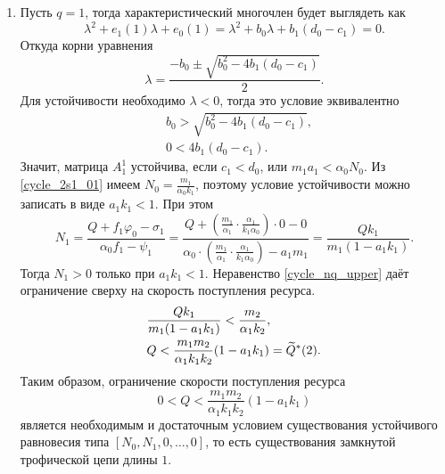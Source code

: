 \begin{enumerate}
\item Пусть \(q = 1\), тогда характеристический многочлен будет выглядеть как
\begin{equation*}
    \lambda^2 + e_1 (1) \lambda + e_0(1) = \lambda^2 + b_0 \lambda + b_1(d_0 - c_1) = 0.
\end{equation*}
Откуда корни уравнения
\begin{equation*}
    \lambda = \frac{-b_0 \pm \sqrt{b_0^2 - 4b_1 (d_0 - c_1)}}{2}.
\end{equation*}
Для устойчивости необходимо \(\lambda < 0\), тогда это условие эквивалентно
\begin{equation*}
    \begin{split}
        & b_0 > \sqrt{b_0^2 - 4b_1 (d_0 - c_1)}, \\
        & 0 < 4b_1 (d_0 - c_1).
    \end{split}
\end{equation*}
Значит, матрица \(A^1_1\) устойчива, если \(c_1 < d_0\), или \(m_1 a_1 < \alpha_0 N_0\). Из \eqref{cycle_2s1_01} имеем \(N_0 = \frac{m_1}{\alpha_0 k_1}\), поэтому условие устойчивости можно записать в виде \(a_1 k_1 < 1\). При этом
\begin{equation*}
    N_1 = \frac{Q + f_{1} \varphi_0 - \sigma_{1}}{ \alpha_0 f_{1} - \psi_{1} } = \frac{Q + \left( \frac{m_1}{\alpha_1} \cdot \frac{\alpha_1}{k_1 \alpha_0} \right) \cdot 0 - 0}{\alpha_0 \cdot \left( \frac{m_1}{\alpha_1} \cdot \frac{\alpha_1}{k_1 \alpha_0} \right) - a_1 m_1} = \frac{Q k_1}{m_1(1 - a_1 k_1)}.
\end{equation*}
Тогда \(N_1 > 0\) только при \(a_1 k_1 < 1\). Неравенство \eqref{cycle_nq_upper} даёт ограничение сверху на скорость поступления ресурса.
\begin{equation*}
    \begin{split}
        & \frac{Q k_1}{m_1(1 - a_1 k_1)} < \frac{m_2}{\alpha_1 k_2}, \\
        & Q < \frac{m_1 m_2}{\alpha_1 k_1 k_2} (1 - a_1 k_1) = \widetilde{Q}^*(2).        
    \end{split}
\end{equation*}
Таким образом, ограничение скорости поступления ресурса
\begin{equation*}
    0 < Q < \frac{m_1 m_2}{\alpha_1 k_1 k_2} (1 - a_1 k_1)
\end{equation*}
является необходимым и достаточным условием существования устойчивого равновесия типа \([N_0, N_1, 0, \dots, 0]\), то есть существования замкнутой трофической цепи длины \(1\).


\end{enumerate}
